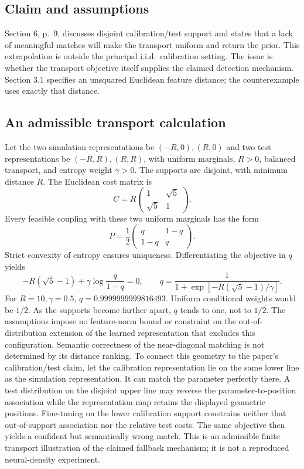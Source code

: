 \documentclass[10pt]{article}
\begin{document}
\subsection*{Claim and assumptions}
Section 6, p. 9, discusses disjoint calibration/test support and states that a lack of meaningful matches will make the transport uniform and return the prior. This extrapolation is outside the principal i.i.d. calibration setting. The issue is whether the transport objective itself supplies the claimed detection mechanism. Section 3.1 specifies an unsquared Euclidean feature distance; the counterexample uses exactly that distance.\par
\subsection*{An admissible transport calculation}
Let the two simulation representations be \((-R,0),(R,0)\) and two test representations be \((-R,R),(R,R)\), with uniform marginals, \(R>0\), balanced transport, and entropy weight \(\gamma>0\). The supports are disjoint, with minimum distance \(R\). The Euclidean cost matrix is \[C=R\begin{pmatrix}1&\sqrt5\\\sqrt5&1\end{pmatrix}.\] Every feasible coupling with these two uniform marginals has the form \[P=\frac12\begin{pmatrix}q&1-q\\1-q&q\end{pmatrix}.\] Strict convexity of entropy ensures uniqueness. Differentiating the objective in \(q\) yields \[-R(\sqrt5-1)+\gamma\log\frac q{1-q}=0,\qquad
q=\frac1{1+\exp[-R(\sqrt5-1)/\gamma]}.\] For \(R=10,\gamma=0.5\), \(q=0.9999999999816493\). Uniform conditional weights would be \(1/2\). As the supports become farther apart, \(q\) tends to one, not to \(1/2\). The assumptions impose no feature-norm bound or constraint on the out-of-distribution extension of the learned representation that excludes this configuration. Semantic correctness of the near-diagonal matching is not determined by its distance ranking. To connect this geometry to the paper’s calibration/test claim, let the calibration representation lie on the same lower line as the simulation representation. It can match the parameter perfectly there. A test distribution on the disjoint upper line may reverse the parameter-to-position association while the representation map retains the displayed geometric positions. Fine-tuning on the lower calibration support constrains neither that out-of-support association nor the relative test costs. The same objective then yields a confident but semantically wrong match. This is an admissible finite transport illustration of the claimed fallback mechanism; it is not a reproduced neural-density experiment.\par
\end{document}
